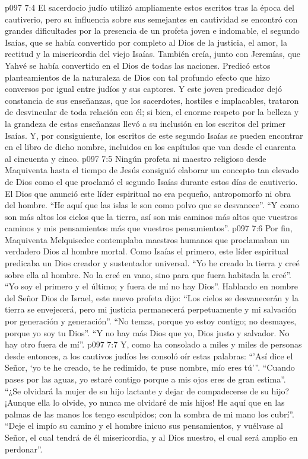 \vs p097 7:4 El sacerdocio judío utilizó ampliamente estos escritos tras la época del cautiverio, pero su influencia sobre sus semejantes en cautividad se encontró con grandes dificultades por la presencia de un profeta joven e indomable, el segundo Isaías, que se había convertido por completo al Dios de la justicia, el amor, la rectitud y la misericordia del viejo Isaías. También creía, junto con Jeremías, que Yahvé se había convertido en el Dios de todas las naciones. Predicó estos planteamientos de la naturaleza de Dios con tal profundo efecto que hizo conversos por igual entre judíos y sus captores. Y este joven predicador dejó constancia de sus enseñanzas, que los sacerdotes, hostiles e implacables, trataron de desvincular de toda relación con él; si bien, el enorme respeto por la belleza y la grandeza de estas enseñanzas llevó a su inclusión en los escritos del primer Isaías. Y, por consiguiente, los escritos de este segundo Isaías se pueden encontrar en el libro de dicho nombre, incluidos en los capítulos que van desde el cuarenta al cincuenta y cinco.
\vs p097 7:5 \pc Ningún profeta ni maestro religioso desde Maquiventa hasta el tiempo de Jesús consiguió elaborar un concepto tan elevado de Dios como el que proclamó el segundo Isaías durante estos días de cautiverio. El Dios que anunció este líder espiritual no era pequeño, antropomorfo ni obra del hombre. “He aquí que las islas le son como polvo que se desvanece”. “Y como son más altos los cielos que la tierra, así son mis caminos más altos que vuestros caminos y mis pensamientos más que vuestros pensamientos”.
\vs p097 7:6 Por fin, Maquiventa Melquisedec contemplaba maestros humanos que proclamaban un verdadero Dios al hombre mortal. Como Isaías el primero, este líder espiritual predicaba un Dios creador y sustentador universal. “Yo he creado la tierra y creé sobre ella al hombre. No la creé en vano, sino para que fuera habitada la creé”. “Yo soy el primero y el último; y fuera de mí no hay Dios”. Hablando en nombre del Señor Dios de Israel, este nuevo profeta dijo: “Los cielos se desvanecerán y la tierra se envejecerá, pero mi justicia permanecerá perpetuamente y mi salvación por generación y generación”. “No temas, porque yo estoy contigo; no desmayes, porque yo soy tu Dios”. “Y no hay más Dios que yo, Dios justo y salvador. No hay otro fuera de mí”.
\vs p097 7:7 Y, como ha consolado a miles y miles de personas desde entonces, a los cautivos judíos les consoló oír estas palabras: “’Así dice el Señor, ‘yo te he creado, te he redimido, te puse nombre, mío eres tú’”. “Cuando pases por las aguas, yo estaré contigo porque a mis ojos eres de gran estima”. “¿Se olvidará la mujer de su hijo lactante y dejar de compadecerse de su hijo? ¡Aunque ella lo olvide, yo nunca me olvidaré de mis hijos! He aquí que en las palmas de las manos los tengo esculpidos; con la sombra de mi mano los cubrí”. “Deje el impío su camino y el hombre inicuo sus pensamientos, y vuélvase al Señor, el cual tendrá de él misericordia, y al Dios nuestro, el cual será amplio en perdonar”.

